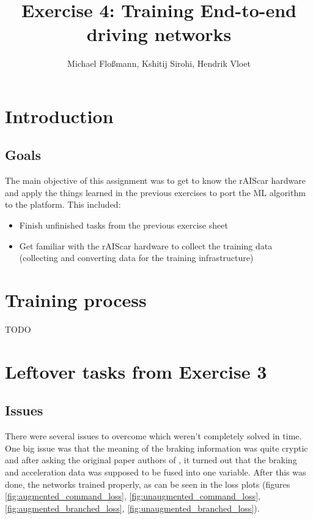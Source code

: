 \documentclass[a4paper]{article}
\title{Exercise 4: Training End-to-end driving networks}
\author{Michael Floßmann, Kshitij Sirohi, Hendrik Vloet}
\begin{document}
\maketitle

\section{Introduction}
\subsection{Goals}
The main objective of this assignment was to get to know the rAIScar hardware
and apply the things learned in the previous exercises to port the ML algorithm
to the platform. This included:
\begin{itemize}
\item Finish unfinished tasks from the previous exercise sheet
\item Get familiar with the rAIScar hardware to collect the training data
  (collecting and converting data for the training infrastructure)
\end{itemize} 

\section{Training process}
TODO

\section{Leftover tasks from Exercise 3}
\subsection{Issues}
There were several issues to overcome which weren't completely solved in time.
One big issue was that the meaning of the braking information was quite cryptic
and after asking the original paper authors of \cite{imitation}, it turned out
that the braking and acceleration data was supposed to be fused into one
variable. After this was done, the networks trained properly, as can be seen in
the loss plots (figures \ref{fig:augmented_command_loss}, \ref{fig:unaugmented_command_loss},
\ref{fig:augmented_branched_loss}, \ref{fig:unaugmented_branched_loss}).
\end{document}
